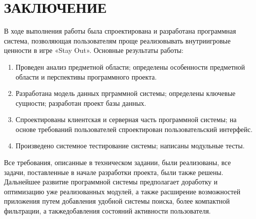 \section*{ЗАКЛЮЧЕНИЕ}

В ходе выполнения работы была спроектирована и разработана программная система, позволяющая пользователям проще реализовывать внутриигровые ценности в игре «Stay Out». Основные результаты работы:

\begin{enumerate}
\item Проведен анализ предметной области; определены особенности предметной области и перспективы программного проекта.
\item Разработана модель данных прграммной системы; определены ключевые сущности; разработан проект базы данных.
\item Спроектированы клиентская и серверная часть программной системы; на основе требований пользователей спроектирован пользовательский интерфейс.
\item Произведено системное тестирование системы; написаны модульные тесты.
\end{enumerate}

Все требования, описанные в техническом задании, были реализованы, все задачи, поставленные в начале разработки проекта, были также решены. Дальнейшее развитие программной системы предполагает доработку и оптимизацию уже реализованных модулей, а также расширение возможностей приложения путем добавления удобной системы поиска, более компактной фильтрации, а такжедобавления состояний активности пользователя.
